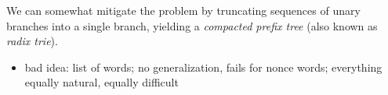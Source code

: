 We can somewhat mitigate the problem by truncating sequences of unary branches into a single branch, yielding a \emph{compacted prefix tree} (also known as \emph{radix trie}).
%
\begin{center}
    
\end{center}



\begin{itemize}
    \item bad idea: list of words; no generalization, fails for nonce words; everything equally natural, equally difficult
\end{itemize}
